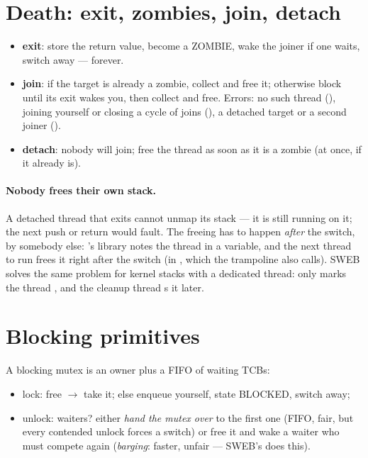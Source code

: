 \section{Death: exit, zombies, join, detach}

\begin{itemize}
  \item \textbf{exit}: store the return value, become a ZOMBIE, wake the
    joiner if one waits, switch away --- forever.
  \item \textbf{join}: if the target is already a zombie, collect and free
    it; otherwise block until its exit wakes you, then collect and free.
    Errors: no such thread (), joining yourself or closing a
    cycle of joins (), a detached target or a second joiner
    ().
  \item \textbf{detach}: nobody will join; free the thread as soon as it
    is a zombie (at once, if it already is).
\end{itemize}

\paragraph{Nobody frees their own stack.} A detached thread that exits
cannot unmap its stack --- it is still running on it; the next push or
return would fault. The freeing has to happen \emph{after} the switch, by
somebody else: 's library notes the thread in a variable, and
the next thread to run frees it right after the switch (in
, which the trampoline also calls). SWEB solves the
same problem for kernel stacks with a dedicated thread:
 only marks the thread , and the
cleanup thread s it later.

\section{Blocking primitives}

A blocking mutex is an owner plus a FIFO of waiting TCBs:
\begin{itemize}
  \item lock: free $\to$ take it; else enqueue yourself, state BLOCKED,
    switch away;
  \item unlock: waiters? either \emph{hand the mutex over} to the first
    one (FIFO, fair, but every contended unlock forces a switch) or free
    it and wake a waiter who must compete again (\emph{barging}: faster,
    unfair --- SWEB's  does this).
\end{itemize}

